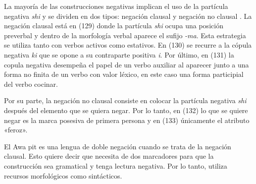 La mayoría de las construcciones negativas implican el uso de la partícula negativa {\setmainfont{Charis SIL} \textit{shi}} y se dividen en dos tipos: negación clausal y negación no clausal \textcolor{MidnightBlue}{\citep{awa}}. La negación clausal está en (129) donde la partícula {\setmainfont{Charis SIL} \textit{shi}} ocupa una posición preverbal y dentro de la morfología verbal aparece el sufijo {\setmainfont{Charis SIL} \textit{-ma}}. Esta estrategia se utiliza tanto con verbos activos como estativos. En (130) se recurre a la cópula negativa {\setmainfont{Charis SIL} \textit{ki}} que se opone a su contraparte positiva \textit{i}. Por último, en (131) la copula negativa desempeña el papel de un verbo auxiliar al aparecer junto a una forma no finita de un verbo con valor léxico, en este caso una forma participial del verbo cocinar.

Por su parte, la negación no clausal consiste en colocar la partícula negativa {\setmainfont{Charis SIL} \textit{shi}} después del elemento que se quiera negar. Por lo tanto, en (132) lo que se quiere negar es la marca posesiva de primera persona y en (133) únicamente el atributo «feroz».

El Awa pit es una lengua de doble negación cuando se trata de la negación clausal. Esto quiere decir que necesita de dos marcadores para que la construcción sea gramatical y tenga lectura negativa. Por lo tanto, utiliza recursos morfológicos como sintácticos.